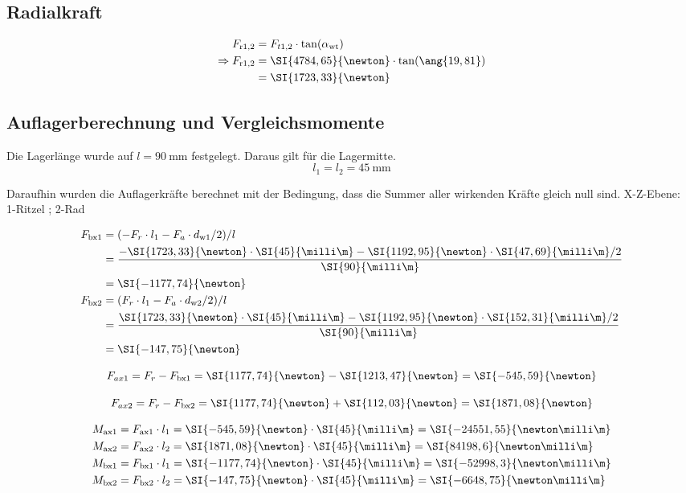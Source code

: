 	\subsection{Radialkraft}
 			\begin{align*}
 				F_{\rm r 1,2} &= F_{t1,2} \cdot \tan(\alpha_{\rm wt}) \\
 				\Rightarrow F_{\rm r 1,2} &= \SI{4784,65}{\newton} \cdot \tan(\ang{19,81})\\
 				&= \SI{1723,33}{\newton}
 			\end{align*}
		\subsection{Auflagerberechnung und Vergleichsmomente }
		
		     Die Lagerlänge wurde auf $l=\SI{90}{\milli\m}$ festgelegt. Daraus gilt für die Lagermitte. $$l_1=l_2=\SI{45}{\milli\m}$$ 

		
		Daraufhin wurden die Auflagerkräfte berechnet mit der Bedingung, dass die Summer aller wirkenden Kräfte gleich null sind. X-Z-Ebene:\\
		1-Ritzel ; 2-Rad
		
		\begin{align*}
		F_{\rm bx1} &=(-F_r\cdot l_1-F_a\cdot d_{\rm w1}/2)/l\\
		&=\frac{-\SI{1723,33}{\newton}\cdot\SI{45}{\milli\m}-\SI{1192,95}{\newton} \cdot \SI{47,69}{\milli\m}/2}{\SI{90}{\milli\m}}\\
		&=\SI{-1177,74}{\newton}\\
		F_{\rm bx2} &=(F_r\cdot l_1-F_a\cdot d_{\rm w2}/2)/l \\
		&= \frac{\SI{1723,33}{\newton}\cdot\SI{45}{\milli\m}-\SI{1192,95}{\newton} \cdot \SI{152,31}{\milli\m}/2}{\SI{90}{\milli\m}}\\
		&=\SI{-147,75}{\newton}
		\end{align*}
		
		$$F_{ax1} = F_r -F_{\rm bx1} = \SI{1177,74}{\newton} - \SI{1213,47}{\newton} = \SI{-545,59}{\newton}$$
		
		$$F_{ax2} = F_r -F_{\rm bx2} = \SI{1177,74}{\newton} + \SI{112,03}{\newton} = \SI{1871,08}{\newton}$$

   		\begin{align*}
		M_{\rm ax1} &= F_{\rm ax1} \cdot l_1  = \SI{-545,59}{\newton}\cdot \SI{45}{\milli\m} = \SI{-24551,55}{\newton\milli\m}\\
		M_{\rm ax2} &= F_{\rm ax2} \cdot l_2  = \SI{1871,08}{\newton}\cdot \SI{45}{\milli\m}  = \SI{84198,6}{\newton\milli\m}\\
		M_{\rm bx1} &= F_{\rm bx1} \cdot l_1  = \SI{-1177,74}{\newton}\cdot \SI{45}{\milli\m}  = \SI{-52998,3}{\newton\milli\m}\\
		M_{\rm bx2} &= F_{\rm bx2} \cdot l_2  = \SI{-147,75}{\newton}\cdot \SI{45}{\milli\m} = \SI{-6648,75}{\newton\milli\m}\\
		\end{align*}
		
